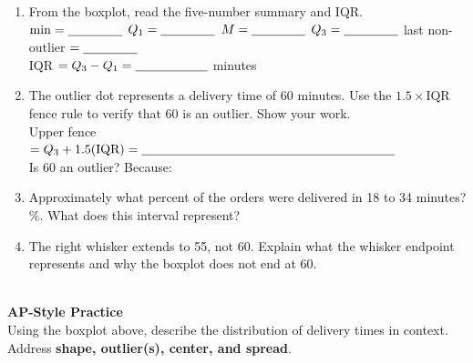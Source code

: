 \documentclass[10pt]{article}
\begin{document}
\begin{enumerate}[leftmargin=1.5em, itemsep=10pt]

  \item From the boxplot, read the five-number summary and IQR.\\[5pt]
        $\min = \blank{1.5cm}$ \quad $Q_1 = \blank{1.5cm}$ \quad $M = \blank{1.5cm}$
        \quad $Q_3 = \blank{1.5cm}$ \quad last non-outlier $= \blank{1.5cm}$\\[4pt]
        IQR $= Q_3 - Q_1 = \blank{2cm}$ minutes

  \item The outlier dot represents a delivery time of 60 minutes.
        Use the $1.5 \times \text{IQR}$ fence rule to verify that 60 is an outlier.
        Show your work.\\[6pt]
        Upper fence $= Q_3 + 1.5(\text{IQR}) = \blank{7cm}$\\[4pt]
        Is 60 an outlier? \blank{2cm} \quad Because: \blank{6cm}

  \item Approximately what percent of the orders were delivered in 18 to 34
        minutes? \blank{3cm}\%. \quad What does this interval represent?
        \blank{5cm}

  \item The right whisker extends to 55, not 60. Explain what the whisker
        endpoint represents and why the boxplot does not end at 60.\\[6pt]
        \writeline\\[1pt]\writeline

\end{enumerate}

\vspace{0.18in}

\begin{tcolorbox}[colback=redbg, colframe=redacc, boxrule=0.8pt, arc=2mm,
    left=4mm, right=4mm, top=3mm, bottom=3mm]
\small\textbf{AP-Style Practice}\\[6pt]
Using the boxplot above, describe the distribution of delivery times in
context. Address \textbf{shape, outlier(s), center, and spread}.\\[10pt]
\writeline\\[1pt]\writeline\\[1pt]\writeline\\[1pt]\writeline
\end{tcolorbox}
\end{document}
